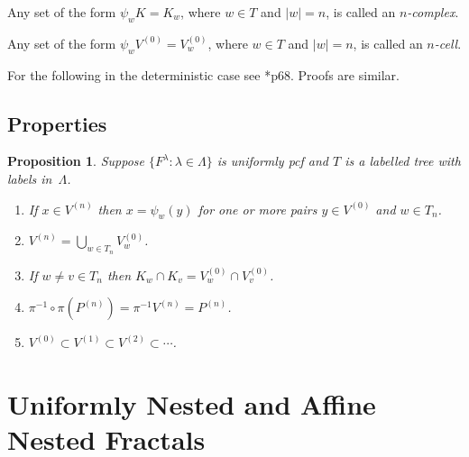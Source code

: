 \documentclass[a4paper]{amsart}
\theoremstyle{plain}
\newtheorem{proposition}[theorem]{Proposition}
\theoremstyle{definition}
\theoremstyle{remark}
\begin{document}
Any set of the form $ \psi_w K = K_w $, where $ w \in T $ and $ |w|=n $, is called an \emph{$ n $-complex}.

Any set of the form $ \psi_w V^{(0)} = V_w^{(0)} $, where $ w \in T $ and $ |w|=n $, is called an \emph{$ n $-cell}.

\medskip For the following in the deterministic case see \cite{Bar}*{p68}.  Proofs are similar.


\subsection{Properties}
\begin{proposition} \label{prpupf}
Suppose $ \{ F^ \lambda : \lambda \in \Lambda \}  $ is uniformly pcf and $ T $ is a labelled tree with labels in~$ \Lambda $.

 \begin{enumerate}

\item
If $ x \in V^{(n)} $ then $ x =   \psi_w(y) $ for one or more pairs $ y \in V^{(0)} $ and $ w \in T_n  $.

\item $ V^{(n)} = \bigcup_{w\in T_n} V_w^{(0)} $.

\item If $ w\neq v \in T_n $ then $ K_w \cap K_v = V_w^{(0)} \cap  V_v^{(0)}$.

\item $ \pi^{-1}\circ \pi (P^{(n)}) = \pi^{-1} V^{(n)} = P^{(n)} $.
\item $ V^{(0)} \subset V^{(1)} \subset V^{(2)} \subset \cdots $.
\end{enumerate} 
\end{proposition} 





\section{\textbf{Uniformly Nested and Affine Nested Fractals}}

\end{document}
